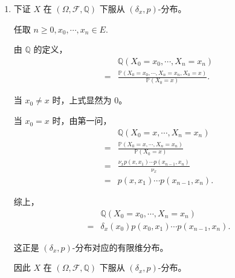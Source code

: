 \documentclass{ctexart}
\begin{document}
\begin{solution}
\begin{enumerate}
      设 \((A_n)_{n \geq 1}\) 两两不交，则
      \begin{align*}
        \mathbb{Q}\left(\bigcup_{n=1}^{\infty} A_n\right)
        &=
        \frac{
          \mathbb{P}
          \left(
            \left(
              \bigcup_{n=1}^{\infty} A_n
            \right)
            \cap
            \{X_0=x\}
          \right)
        }{
          \mathbb{P}(X_0=x)
        }
        \\
        &=
        \frac{
          \mathbb{P}
          \left(
            \bigcup_{n=1}^{\infty}
            (A_n \cap \{X_0=x\})
          \right)
        }{
          \mathbb{P}(X_0=x)
        }
        \\
        &=
        \sum_{n=1}^{\infty}
        \frac{
          \mathbb{P}(A_n \cap \{X_0=x\})
        }{
          \mathbb{P}(X_0=x)
        }
        \\
        &=
        \sum_{n=1}^{\infty}
        \mathbb{Q}(A_n).
      \end{align*}

      因此 \(\mathbb{Q}\) 是 \((\Omega,\mathcal{F})\) 上的概率测度。

    \item 下证 \(X\) 在 \((\Omega,\mathcal{F},\mathbb{Q})\) 下服从 \((\delta_x,p)\)-分布。

      任取
      \( n \geq 0, x_0,\cdots,x_n \in E. \)

      由 \(\mathbb{Q}\) 的定义，
      \begin{align*}
        &\mathbb{Q}(X_0=x_0,\cdots,X_n=x_n)
        \\
        ={}&
        \frac{
          \mathbb{P}
          (
            X_0=x_0,\cdots,X_n=x_n,X_0=x
          )
        }{
          \mathbb{P}(X_0=x)
        }.
      \end{align*}

      当 \(x_0 \neq x\) 时，上式显然为 \(0\)。

      当 \(x_0=x\) 时，由第一问，
      \begin{align*}
        &\mathbb{Q}(X_0=x,\cdots,X_n=x_n)
        \\
        ={}&
        \frac{
          \mathbb{P}(X_0=x,\cdots,X_n=x_n)
        }{
          \mathbb{P}(X_0=x)
        }
        \\
        ={}&
        \frac{
          \nu_x
          p(x,x_1)\cdots p(x_{n-1},x_n)
        }{
          \nu_x
        }
        \\
        ={}&
        p(x,x_1)\cdots p(x_{n-1},x_n).
      \end{align*}

      综上，
      \begin{align*}
        &\mathbb{Q}(X_0=x_0,\cdots,X_n=x_n)
        \\
        ={}&
        \delta_x(x_0)
        p(x_0,x_1)\cdots p(x_{n-1},x_n).
      \end{align*}

      这正是 \((\delta_x,p)\)-分布对应的有限维分布。

      因此 \(X\) 在 \((\Omega,\mathcal{F},\mathbb{Q})\) 下服从 \((\delta_x,p)\)-分布。
  \end{enumerate}
\end{solution}
\end{document}
